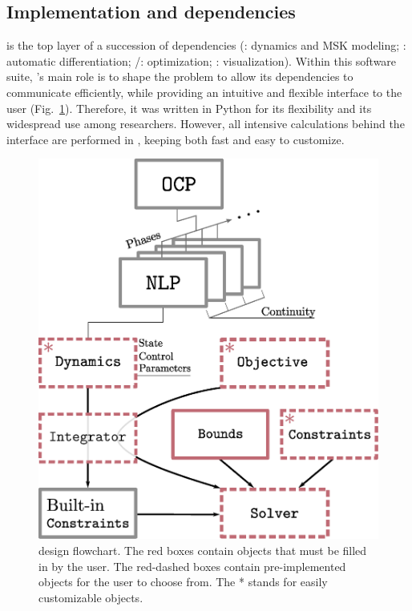 \subsection{Implementation and dependencies}
\bioptim is the top layer of a succession of dependencies (\biorbd: dynamics and MSK modeling; \casadi: automatic differentiation; \ipopt/\acados: optimization; \bioviz: visualization).
Within this software suite, \bioptim 's main role is to shape the problem to allow its dependencies to communicate efficiently, while providing an intuitive and flexible interface to the user (Fig.~\ref{fig:dependencies}).
Therefore, it was written in Python for its flexibility and its widespread use among researchers.
However, all intensive calculations behind the interface are performed in , keeping \bioptim both fast and easy to customize.

\begin{figure}[t!]
\centering
\includegraphics[width=0.9\columnwidth]{figures/design.eps}
\caption{\bioptim design flowchart. The red boxes contain objects that must be filled in by the user. The red-dashed boxes contain pre-implemented objects for the user to choose from. The * stands for easily customizable objects.}
\label{fig:dependencies}
\vspace*{-0.5cm}
\end{figure}



